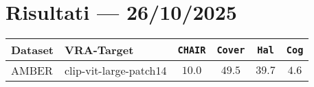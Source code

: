 \documentclass[a4paper,11pt]{article}
\begin{document}
	
	\section*{Risultati --- 26/10/2025}
	
	\begin{table}[h]
		\centering
		\begin{tabular}{ll|cccc}
			\toprule
			\textbf{Dataset} & \textbf{VRA-Target} & \texttt{CHAIR} & \texttt{Cover} & \texttt{Hal} & \texttt{Cog} \\
			\midrule
			AMBER & clip-vit-large-patch14 & $10.0$ & $49.5$ & $39.7$ & $4.6$ \\
			\bottomrule
		\end{tabular}
	\end{table}
	
\end{document}
